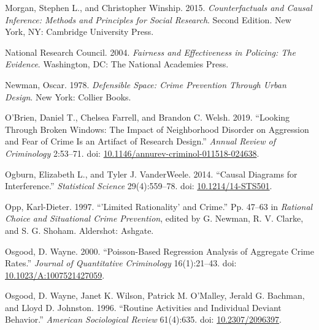 \documentclass [11pt, proquest] {uwthesis}[2015/03/03]
\newlength{\cslhangindent}
\newenvironment{CSLReferences}[2]%
{\setlength{\parindent}{0pt}%
\everypar{\setlength{\hangindent}{\cslhangindent}}\ignorespaces}%
{\par}
\begin{document}
\begin{CSLReferences}{1}{0}
\leavevmode\hypertarget{ref-morganCounterfactualsCausalInference2015}{}%
Morgan, Stephen L., and Christopher Winship. 2015. \emph{Counterfactuals and {Causal Inference}: {Methods} and {Principles} for {Social Research}}. Second Edition. {New York, NY}: {Cambridge University Press}.

\leavevmode\hypertarget{ref-nationalresearchcouncilFairnessEffectivenessPolicing2004}{}%
National Research Council. 2004. \emph{Fairness and {Effectiveness} in {Policing}: {The Evidence}}. {Washington, DC}: {The National Academies Press}.

\leavevmode\hypertarget{ref-newmanDefensibleSpaceCrime1978}{}%
Newman, Oscar. 1978. \emph{Defensible {Space}: {Crime Prevention} Through {Urban Design}}. {New York}: {Collier Books}.

\leavevmode\hypertarget{ref-obrienLookingBrokenWindows2019}{}%
O'Brien, Daniel T., Chelsea Farrell, and Brandon C. Welsh. 2019. {``Looking {Through Broken Windows}: {The Impact} of {Neighborhood Disorder} on {Aggression} and {Fear} of {Crime Is} an {Artifact} of {Research Design}.''} \emph{Annual Review of Criminology} 2:53--71. doi: \href{https://doi.org/10.1146/annurev-criminol-011518-024638}{10.1146/annurev-criminol-011518-024638}.

\leavevmode\hypertarget{ref-ogburnCausalDiagramsInterference2014}{}%
Ogburn, Elizabeth L., and Tyler J. VanderWeele. 2014. {``Causal {Diagrams} for {Interference}.''} \emph{Statistical Science} 29(4):559--78. doi: \href{https://doi.org/10.1214/14-STS501}{10.1214/14-STS501}.

\leavevmode\hypertarget{ref-oppLimitedRationalityCrime1997}{}%
Opp, Karl-Dieter. 1997. {``'{Limited Rationality}' and {Crime}.''} Pp. 47--63 in \emph{Rational {Choice} and {Situational Crime Prevention}}, edited by G. Newman, R. V. Clarke, and S. G. Shoham. {Aldershot}: {Ashgate}.

\leavevmode\hypertarget{ref-osgoodPoissonBasedRegressionAnalysis2000}{}%
Osgood, D. Wayne. 2000. {``Poisson-{Based Regression Analysis} of {Aggregate Crime Rates}.''} \emph{Journal of Quantitative Criminology} 16(1):21--43. doi: \href{https://doi.org/10.1023/A:1007521427059}{10.1023/A:1007521427059}.

\leavevmode\hypertarget{ref-osgoodRoutineActivitiesIndividual1996}{}%
Osgood, D. Wayne, Janet K. Wilson, Patrick M. O'Malley, Jerald G. Bachman, and Lloyd D. Johnston. 1996. {``Routine {Activities} and {Individual Deviant Behavior}.''} \emph{American Sociological Review} 61(4):635. doi: \href{https://doi.org/10.2307/2096397}{10.2307/2096397}.


\end{CSLReferences}
\end{document}
